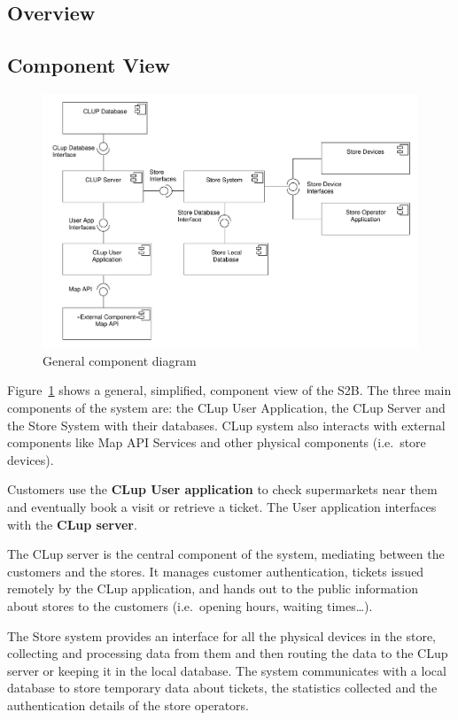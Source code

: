 \subsection{Overview}

\subsection{Component View}
\begin{figure}[H]
    \includegraphics[width=\textwidth]{Images/UML_general_component.pdf}
    \caption{\label{fig:UML_comp_general}General component diagram}
\end{figure}
Figure~\ref{fig:UML_comp_general} shows a general, simplified, component view of the S2B.
The three main components of the system are: the CLup User Application, the CLup Server and the Store System with their databases. CLup system also interacts with external components like Map API Services and other physical components (i.e.~store devices).

Customers use the \textbf{CLup User application} to check supermarkets near them and eventually book a visit or retrieve a ticket. The User application interfaces with the \textbf{CLup server}. 

The CLup server is the central component of the system, mediating between the customers and the stores. It manages customer authentication, tickets issued remotely by the CLup application, and hands out to the public information about stores to the customers (i.e.~opening hours, waiting times\ldots).

The Store system provides an interface for all the physical devices in the store, collecting and processing data from them and then routing the data to the CLup server or keeping it in the local database. The system communicates with a local database to store temporary data about tickets, the statistics collected and the authentication details of the store operators.

